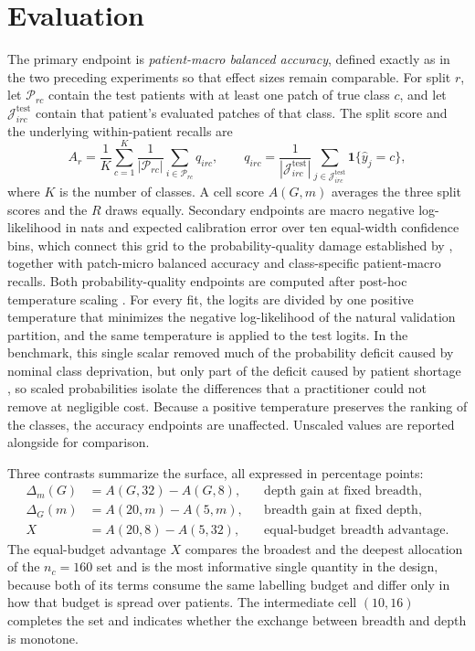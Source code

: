 \documentclass[11pt]{article}
\begin{document}
\section{Evaluation}
\label{sec:evaluation}
The primary endpoint is \emph{patient-macro balanced accuracy}, defined exactly as in the two preceding experiments so that effect sizes remain comparable. For split $r$, let $\mathcal P_{rc}$ contain the test patients with at least one patch of true class $c$, and let $\mathcal J^{\mathrm{test}}_{irc}$ contain that patient's evaluated patches of that class. The split score and the underlying within-patient recalls are
\begin{equation}
  A_r=\frac1K\sum_{c=1}^{K}\frac1{|\mathcal P_{rc}|}\sum_{i\in\mathcal P_{rc}}q_{irc},
  \qquad
  q_{irc}=\frac1{|\mathcal J^{\mathrm{test}}_{irc}|}\sum_{j\in\mathcal J^{\mathrm{test}}_{irc}}\mathbf 1\{\widehat y_j=c\},
  \label{eq:accuracy}
\end{equation}
\noindent where $K$ is the number of classes. A cell score $A(G,m)$ averages the three split scores and the $R$ draws equally. Secondary endpoints are macro negative log-likelihood in nats and expected calibration error over ten equal-width confidence bins, which connect this grid to the probability-quality damage established by \citet{queisler2026benchmarkResults}, together with patch-micro balanced accuracy and class-specific patient-macro recalls. Both probability-quality endpoints are computed after post-hoc temperature scaling \citep{guo2017calibration}. For every fit, the logits are divided by one positive temperature that minimizes the negative log-likelihood of the natural validation partition, and the same temperature is applied to the test logits. In the benchmark, this single scalar removed much of the probability deficit caused by nominal class deprivation, but only part of the deficit caused by patient shortage \citep{queisler2026benchmarkResults}, so scaled probabilities isolate the differences that a practitioner could not remove at negligible cost. Because a positive temperature preserves the ranking of the classes, the accuracy endpoints are unaffected. Unscaled values are reported alongside for comparison.

Three contrasts summarize the surface, all expressed in percentage points:
\begin{align}
  \Delta_m(G)&=A(G,32)-A(G,8), &&\text{depth gain at fixed breadth},\label{eq:depth}\\
  \Delta_G(m)&=A(20,m)-A(5,m), &&\text{breadth gain at fixed depth},\label{eq:breadth}\\
  X&=A(20,8)-A(5,32), &&\text{equal-budget breadth advantage}.\label{eq:isobudget}
\end{align}
\noindent The equal-budget advantage $X$ compares the broadest and the deepest allocation of the $n_c=160$ set and is the most informative single quantity in the design, because both of its terms consume the same labelling budget and differ only in how that budget is spread over patients. The intermediate cell $(10,16)$ completes the set and indicates whether the exchange between breadth and depth is monotone.
\end{document}
